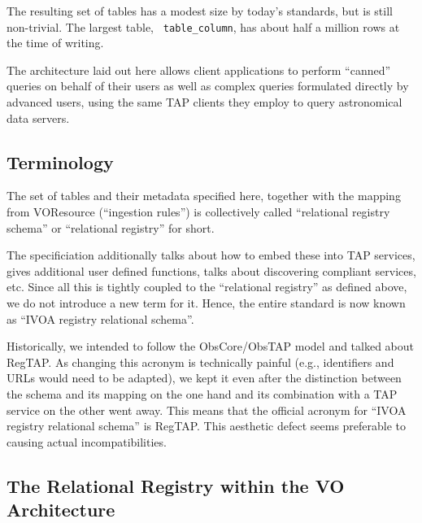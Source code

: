 \documentclass[11pt,a4paper]{ivoa}
\newcommand{\rtent}[1]{\texttt{\color{rtcolor} #1}}
\begin{document}
The resulting set of tables has a modest size by today's standards,
but is still non-trivial.  The largest table, \rtent{table\_column},
has about half a million rows at the time of writing.

The architecture laid out here allows client applications to perform ``canned''
queries on behalf of their users as well as complex queries formulated
directly by advanced users, using the same TAP clients they employ to
query astronomical data servers.


\subsection{Terminology}

\label{terms}

The set of tables and their metadata specified here, together with
the mapping from VOResource (``ingestion rules'') is collectively
called ``relational registry schema'' or ``relational registry'' for
short.

The specificiation additionally talks about how to embed these into TAP
services, gives additional user defined functions, talks about
discovering compliant services, etc.  Since all this is tightly coupled
to the ``relational registry'' as defined above, we do not 
introduce a new term for it.  Hence, the entire standard is now known as
``IVOA registry relational schema''.

Historically, we intended to follow the ObsCore/ObsTAP model and
talked about RegTAP.  As changing this acronym is technically painful
(e.g., identifiers and URLs would need to be adapted), we kept it even after
the distinction between the schema and its mapping on the one hand and
its combination with a TAP service on the other went away.  This
means that the official acronym for ``IVOA registry relational schema'' is
RegTAP.  This aesthetic defect seems preferable to causing actual
incompatibilities.


\subsection{The Relational Registry within the VO Architecture}

\label{rolewithinivoa}
\end{document}
